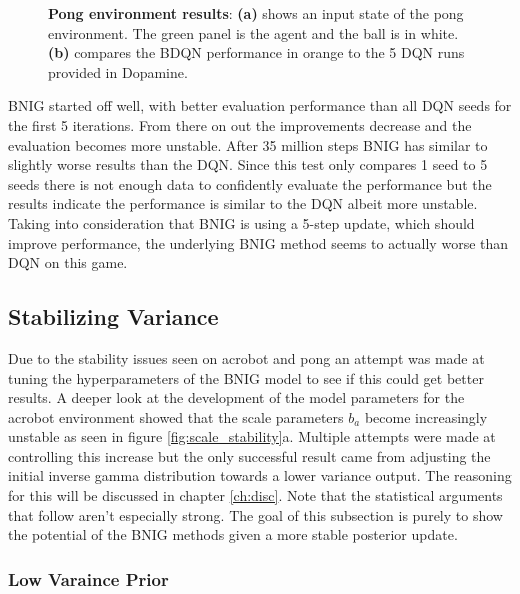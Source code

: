 \begin{figure}[H]
    \caption{\textbf{Pong environment results}: \textbf{(a)} shows an input state of the pong environment\citep{gym_docs}. The green panel is the agent and the ball is in white. \textbf{(b)} compares the BDQN performance in orange to the 5 DQN runs provided in Dopamine.}
    \label{fig:nn_pong}
\end{figure}

BNIG started off well, with better evaluation performance than all DQN seeds for the first 5 iterations. From there on out the improvements decrease and the evaluation becomes more unstable. After 35 million steps BNIG has similar to slightly worse results than the DQN. Since this test only compares 1 seed to 5 seeds there is not enough data to confidently evaluate the performance but the results indicate the performance is similar to the DQN albeit more unstable. Taking into consideration that BNIG is using a 5-step update, which should improve performance, the underlying BNIG method seems to actually worse than DQN on this game.

\subsection{Stabilizing Variance}

Due to the stability issues seen on acrobot and pong an attempt was made at tuning the hyperparameters of the BNIG model to see if this could get better results. A deeper look at the development of the model parameters for the acrobot environment showed that the scale parameters $b_a$ become increasingly unstable as seen in figure \ref{fig:scale_stability}a. Multiple attempts were made at controlling this increase but the only successful result came from adjusting the initial inverse gamma distribution towards a lower variance output. The reasoning for this will be discussed in chapter \ref{ch:disc}. Note that the statistical arguments that follow aren't especially strong. The goal of this subsection is purely to show the potential of the BNIG methods given a more stable posterior update.  %

\subsubsection{Low Varaince Prior}

